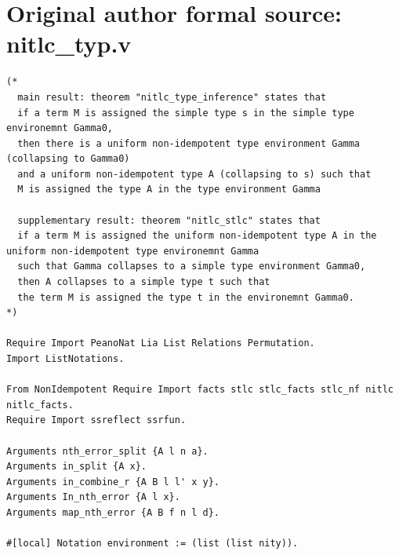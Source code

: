 \section*{Original author formal source: nitlc\_typ.v}
\begin{lstlisting}[style=authorcoq]
(*
  main result: theorem "nitlc_type_inference" states that
  if a term M is assigned the simple type s in the simple type environemnt Gamma0,
  then there is a uniform non-idempotent type environment Gamma (collapsing to Gamma0)
  and a uniform non-idempotent type A (collapsing to s) such that
  M is assigned the type A in the type environment Gamma

  supplementary result: theorem "nitlc_stlc" states that
  if a term M is assigned the uniform non-idempotent type A in the uniform non-idempotent type environemnt Gamma
  such that Gamma collapses to a simple type environment Gamma0,
  then A collapses to a simple type t such that
  the term M is assigned the type t in the environemnt Gamma0.
*)

Require Import PeanoNat Lia List Relations Permutation.
Import ListNotations.

From NonIdempotent Require Import facts stlc stlc_facts stlc_nf nitlc nitlc_facts.
Require Import ssreflect ssrfun.

Arguments nth_error_split {A l n a}.
Arguments in_split {A x}.
Arguments in_combine_r {A B l l' x y}.
Arguments In_nth_error {A l x}.
Arguments map_nth_error {A B f n l d}.

#[local] Notation environment := (list (list nity)).


\end{lstlisting}
